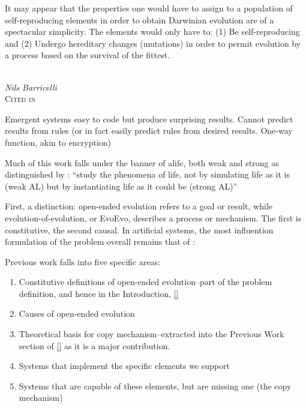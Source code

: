 \epigraph{%
	It may appear that the properties one would have to assign to a population of self-reproducing elements in order to obtain Darwinian evolution are of a spectacular simplicity. The elements would only have to: (1) Be self-reproducing and (2) Undergo hereditary changes (mutations) in order to permit evolution by a process based on the survival of the fittest.}%
{\textit{\\Nils Barricelli}\\\textsc{Cited in \cite{Taylor2001}}}



Emergent systems easy to code but produce surprising results. Cannot predict results from rules (or in fact easily predict rules from desired results. One-way function, akin to encryption) \parencite{Nellis2014}

Much of this work falls under the banner of \gls{alife}, both weak and strong as distinguished by \cite{Langton1989}: ``study the phenomena of life, not by simulating life as it is (weak AL) but by instantiating life as it could be (strong AL)''

First, a distinction: open-ended evolution refers to a goal or result, while evolution-of-evolution, or EvoEvo, describes a process or mechanism. The first is constitutive, the second causal. In artificial systems, the most influention formulation of the problem overall remains that of \cite{Bedau:2000mi}:


Previous work falls into five specific areas:
\begin{enumerate}
\item Constitutive definitions of open-ended evolution--part of the problem definition, and hence in the Introduction, \ref{}
\item Causes of open-ended evolution
\item Theoretical basis for copy mechanism--extracted into the Previous Work section of \ref{} as it is a major contribution.
\item Systems that implement the specific elements we support
\item Systems that are capable of these elements, but are missing one (the copy mechanism)
\end{enumerate}


